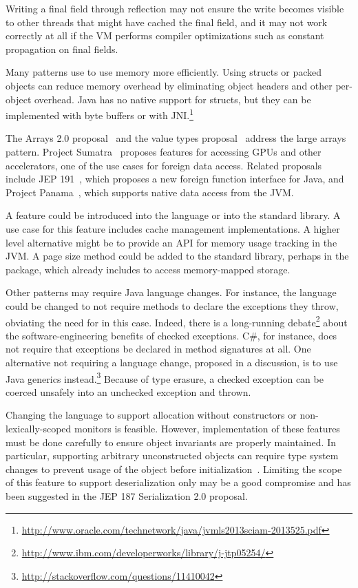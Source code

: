 Writing a final field through reflection may not ensure
the write becomes visible to other threads that might have cached the final
field, and it may not work correctly at all if the VM performs compiler
optimizations such as constant propagation on final fields.

Many patterns use \unsafe{} to use memory more efficiently.
Using structs or packed objects can reduce memory overhead by eliminating 
object headers and other per-object overhead.
Java has no native support for structs, but
they can be implemented with byte buffers or with
JNI.\footnote{\url{http://www.oracle.com/technetwork/java/jvmls2013sciam-2013525.pdf}}

The Arrays 2.0
proposal~\cite{arrays20} and the value types proposal~\cite{valuetypes}
address the large arrays pattern. 
Project Sumatra~\cite{layouts} proposes features for accessing GPUs
and other accelerators, one of the use cases for foreign data access.
Related proposals include JEP 191~\cite{jep191}, which proposes a
new 
foreign function interface for Java, and Project Panama~\cite{panama},
which supports native data access from the JVM.

A  feature could be introduced into the language or
into the standard library.
A use case for this feature includes cache management implementations.
A higher level alternative might be to provide an API for memory usage tracking in the
JVM.
A page size method could be added to 
the standard library, perhaps in
  the  package, which already includes
 to access memory-mapped storage.


Other patterns may require Java language changes.
For instance, 
the language could be changed to not require methods to declare 
the exceptions they throw, obviating the need for \unsafe{} in this case.
  Indeed, there is a long-running
  debate\footnote{\url{http://www.ibm.com/developerworks/library/j-jtp05254/}} about the
  software-engineering benefits of checked exceptions.
C\#, for instance, does not require that exceptions be declared in method signatures at all.
One alternative not requiring a language change, proposed in a \stackoverflow
discussion, is to use Java generics
instead.\footnote{\url{http://stackoverflow.com/questions/11410042}} Because
of type erasure, a checked exception can be coerced unsafely into an unchecked exception and thrown.

Changing the language to support allocation without constructors or non-lexically-scoped monitors is feasible.
However, implementation of these
features must be done carefully to ensure object invariants
are properly maintained. In particular, supporting arbitrary unconstructed
objects can require type system changes to prevent usage of the object 
before initialization~\cite{qiMaskedTypesSound2009}.
Limiting the scope of this feature to support deserialization only may be a good compromise and
has been suggested in the JEP 187 Serialization 2.0 proposal.

